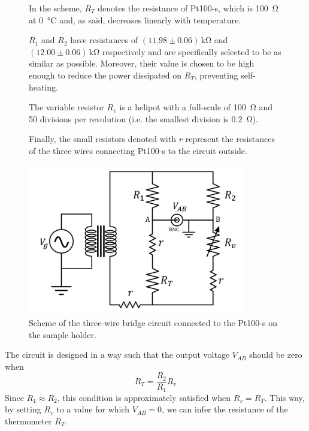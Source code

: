 \documentclass[rmp,10pt,onecolumn,fleqn,notitlepage]{revtex4-1}
\begin{document}
\begin{figure}[H]
    \fontsize{10pt}{12pt}\selectfont
    \begin{minipage}{0.42\linewidth}\setlength{\parindent}{9pt}
    In the scheme, $R_{T}$ denotes the resistance of Pt100-s, which is \SI{100}{\ohm} at \SI{0}{\celsius} and, as said, decreases linearly with temperature.
    
     $R_1$ and $R_2$ have resistances of $(11.98\pm0.06)\, \si{\kilo\ohm}$  and $(12.00\pm0.06)\, \si{\kilo\ohm}$  respectively and are specifically selected to be as similar as possible. Moreover, their value is chosen to be high enough to reduce the power dissipated on $R_T$, preventing self-heating. 
     
     The variable resistor $R_v$ is a helipot with a full-scale of \SI{100}{\ohm} and 50 divisions per revolution (i.e. the smallest division is \SI{0.2}{\ohm}). 
    
    Finally, the small resistors denoted with $r$ represent the resistances of the three wires connecting Pt100-s to the circuit outside.
    \end{minipage}
\hfill
    \begin{minipage}{0.5\linewidth}
    \centering
    \includegraphics[width=0.85\textwidth]{image/schemes/Term_circ.pdf}
    \caption{Scheme of the three-wire bridge circuit connected to the Pt100-s on the sample holder.}
    \label{fig:T_circ}
    \end{minipage}
\end{figure}

The circuit is designed in a way such that the output voltage $V_{AB}$ should be zero when
    \begin{equation}
        R_{T}=\frac{R_{2}}{R_{1}}R_{v}
    \label{eq:Rt}
    \end{equation}
Since $R_1 \approx R_2$, this condition is approximately satisfied when $R_v = R_T$. This way, by setting $R_v$ to a value for which $V_{AB} = 0$, we can infer the resistance of the thermometer $R_T$. 
\end{document}
